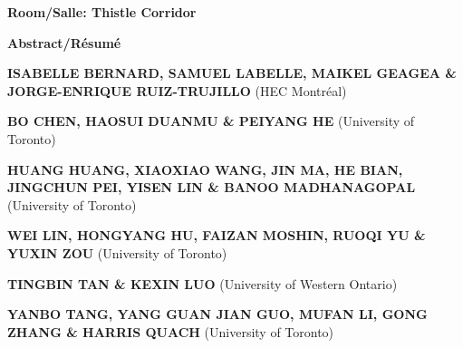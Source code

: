 \begin{center}\large\bfseries Room/Salle: Thistle Corridor\end{center}
\label{abs-sid:wps}
\begin{center}{\large\bfseries Abstract/R\'esum\'e}
\end{center}
\def\whenwhere{[Monday May 30 / lundi 30 mai, 12:00]\\}
{%
\medskip\par\textbf{ISABELLE BERNARD, SAMUEL LABELLE, MAIKEL GEAGEA \& JORGE-ENRIQUE RUIZ-TRUJILLO} (HEC Montréal)
}
\def\whenwhere{[Monday May 30 / lundi 30 mai, 12:00]\\}
{%
\medskip\par\textbf{BO CHEN, HAOSUI DUANMU \& PEIYANG HE} (University of Toronto)
}
\def\whenwhere{[Monday May 30 / lundi 30 mai, 12:00]\\}
{%
\medskip\par\textbf{HUANG HUANG, XIAOXIAO WANG, JIN MA, HE BIAN, JINGCHUN PEI, YISEN LIN \& BANOO MADHANAGOPAL} (University of Toronto)
}
\def\whenwhere{[Monday May 30 / lundi 30 mai, 12:00]\\}
{%
\medskip\par\textbf{WEI LIN, HONGYANG HU, FAIZAN MOSHIN, RUOQI YU \& YUXIN ZOU} (University of Toronto)
}
\def\whenwhere{[Monday May 30 / lundi 30 mai, 12:00]\\}
{%
\medskip\par\textbf{TINGBIN TAN \& KEXIN LUO} (University of Western Ontario)
}
\def\whenwhere{[Monday May 30 / lundi 30 mai, 12:00]\\}
{%
\medskip\par\textbf{YANBO TANG, YANG GUAN JIAN GUO, MUFAN LI, GONG ZHANG \& HARRIS QUACH} (University of Toronto)
}
